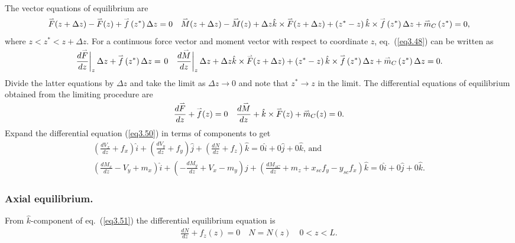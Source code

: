 \documentclass{AeroStructure-ERJohnson}
\def\harp#1{\smash{\mathord{\buildrel{\lower3pt\hbox{$\scriptscriptstyle\rightharpoonup$}}\over{#1}}}}
\begin{document}
The vector equations of equilibrium are
\begin{align}\label{eq3.48}
\harp{F}(z+\Delta z)-\harp{F}(z)+\harp{f}\left(z^{*}\right) \Delta z=0 \quad \harp{M}(z+\Delta z)-\harp{M}(z)+\Delta z \hat{k} \times \harp{F}(z+\Delta z)+\left(z^{*}-z\right) \hat{k} \times \harp{f}\left(z^{*}\right) \Delta z+ \harp{m}_{C}\left(z^{*}\right)=0,
\end{align}
where $z<z^{*}<z+\Delta z$. For a continuous force vector and moment vector with respect to coordinate $z$, eq.~(\ref{eq3.48}) can be written as
\begin{align}\label{eq3.49}
\left.\frac{d \harp{F}}{d z}\right|_{z} \Delta z+\harp{f}\left(z^{*}\right) \Delta z=\left.0 \quad \frac{d \harp{M}}{d z}\right|_{z} \Delta z+\Delta z \hat{k} \times \harp{F}(z+\Delta z)+\left(z^{*}-z\right) \hat{k} \times \harp{f}\left(z^{*}\right) \Delta z+\harp{m}_{C}\left(z^{*}\right) \Delta z=0.
\end{align}
Divide the latter equations by $\Delta z$ and take the limit as $\Delta z \rightarrow 0$ and note that $z^{*} \rightarrow z$ in the limit. The differential equations of equilibrium obtained from the limiting procedure are
\begin{align}\label{eq3.50}
\frac{d \harp{F}}{d z}+\harp{f}(z)=0 \quad \frac{d \harp{M}}{d z}+\hat{k} \times \harp{F}(z)+\harp{m}_{C}(z)=0.
\end{align}
Expand the differential equation (\ref{eq3.50}) in terms of components to get
\begin{align}
\left(\frac{d V_{x}}{d z}+f_{x}\right) \hat{i}+\left(\frac{d V_{y}}{d z}+f_{y}\right) \hat{j}+\left(\frac{d N}{d z}+f_{z}\right) \hat{k}=0 \hat{i}+0 \hat{j}+0 \hat{k}\mbox{, and}\label{eq3.51}\\
\left(\frac{d M_{x}}{d z}-V_{y}+m_{x}\right) \hat{i}+\left(-\frac{d M_{y}}{d z}+V_{x}-m_{y}\right) \hat{j}+\left(\frac{d M_{z C}}{d z}+m_{z}+x_{sc} f_{y}-y_{sc} f_{x}\right) \hat{k}=0 \hat{i}+0 \hat{j}+0 \hat{k}.\label{eq3.52}
\end{align}

\subsubsection{Axial equilibrium.} From $\hat{k}$-component of eq.~(\ref{eq3.51}) the differential equilibrium equation is
\begin{align}\label{eq3.53}
\frac{d N}{d z}+f_{z}(z)=0 \quad N=N(z) \quad 0<z<L.
\end{align}
\end{document}
